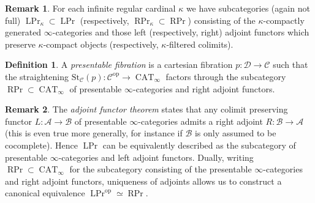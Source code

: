\documentclass{article}
\theoremstyle{definition}
\newtheorem{definition}{Definition}[subsection]
\newtheorem{remark}{Remark}[subsection]
\newcommand{\A}{\mathcal{A}}
\newcommand{\B}{\mathcal{B}}
\newcommand{\C}{\mathcal{C}}
\newcommand{\D}{\mathcal{D}}
\renewcommand{\i}{\infty}
\newcommand{\op}{\mathrm{op}}
\DeclareMathOperator{\CAT}{CAT}
\DeclareMathOperator{\PrL}{LPr}
\DeclareMathOperator{\PrR}{RPr}
\begin{document}
\begin{remark}
For each infinite regular cardinal $\kappa$ we have subcategories (again not full) $\PrL_\kappa\subset\PrL$
\index{$\PrL_\kappa$}
\index{$\PrR_\kappa$}
(respectively, $\PrR_\kappa\subset\PrR$) consisting of the $\kappa$-compactly generated $\infty$-categories and those left (respectively, right) adjoint functors which preserve $\kappa$-compact objects (respectively, $\kappa$-filtered colimits).
\end{remark}



\begin{definition}
A {\em presentable fibration}
is a cartesian fibration $p:\D\to\C$ such that the straightening $\mathrm{St}_\C(p):\C^{\op}\to\CAT_\i$ factors through the subcategory $\PrR\subset\CAT_\i$ of presentable $\i$-categories and right adjoint functors.
\end{definition}

\begin{remark}\label{rem:aft}
The {\em adjoint functor theorem}
\cite[Corollary 5.5.2.9]{HTT} states that any colimit preserving functor $L:\A\to\B$ of presentable $\i$-categories admits a right adjoint $R:\B\to\A$ (this is even true more generally, for instance if $\B$ is only assumed to be cocomplete).
Hence $\PrL$ can be equivalently described as the subcategory of presentable $\i$-categories and left adjoint functors.
Dually, writing $\PrR\subset\CAT_\i$ for the subcategory consisting of the presentable $\i$-categories and right adjoint functors, uniqueness of adjoints allows us to construct a canonical equivalence
$
\PrL^{\op}\simeq\PrR.
$
\end{remark}
\end{document}
